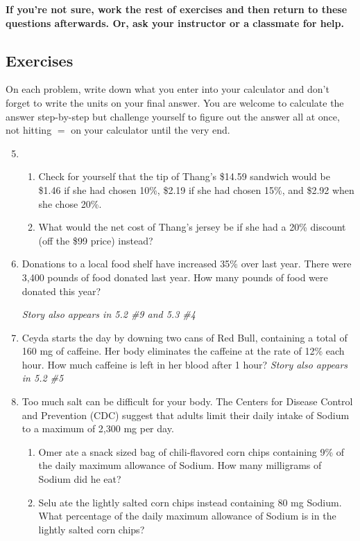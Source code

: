 \noindent \textbf{If you're not sure, work the rest of exercises and then return to these questions afterwards.  Or, ask your instructor or a classmate for help.}

\subsection*{Exercises}

On each problem, write down what you enter into your calculator and don't forget to write the units on your final answer.  You are welcome to calculate the answer step-by-step but challenge yourself to figure out the answer all at once, not hitting $=$ on your calculator until the very end.

\begin{enumerate} 
\setcounter{enumi}{4}

\item \begin{enumerate}
\item Check for yourself that the tip of Thang's \$14.59 sandwich would be \$1.46 if she had chosen 10\%, \$2.19 if she had chosen 15\%, and \$2.92 when she chose 20\%.
\item What would the net cost of Thang's jersey be if she had a 20\% discount (off the \$99 price) instead?
\end{enumerate}

 \item Donations to a local food shelf have increased 35\% over last year.  There were 3,400 pounds of food donated last year. How many pounds of food were donated this year? 
 
 \hfill \emph{Story also appears in 5.2 \#9 and 5.3 \#4} 

\item Ceyda starts the day by downing two cans of Red Bull, containing a total of 160 mg of caffeine.  Her body eliminates the caffeine at the rate of 12\% each hour. How much caffeine is left in her blood after 1 hour?  \hfill \emph{Story also appears in 5.2 \#5}

\item Too much salt can be difficult for your body.  The Centers for Disease Control and Prevention (CDC) suggest that adults limit their daily intake of Sodium to a maximum of 2,300 mg per day.
\begin{enumerate}
\item Omer ate a snack sized bag of chili-flavored corn chips containing 9\% of the daily maximum allowance of Sodium.  How many milligrams of Sodium did he eat?
\item Selu ate the lightly salted corn chips instead containing 80 mg Sodium.  What percentage of the daily maximum allowance of Sodium is in the lightly salted corn chips?
\end{enumerate}


\end{enumerate}
